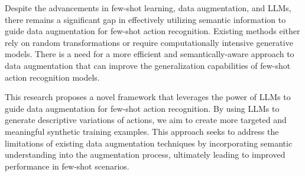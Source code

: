 Despite the advancements in few-shot learning, data augmentation, and LLMs, there remains a significant gap in effectively utilizing semantic information to guide data augmentation for few-shot action recognition. Existing methods either rely on random transformations or require computationally intensive generative models. There is a need for a more efficient and semantically-aware approach to data augmentation that can improve the generalization capabilities of few-shot action recognition models.\newline

This research proposes a novel framework that leverages the power of LLMs to guide data augmentation for few-shot action recognition. By using LLMs to generate descriptive variations of actions, we aim to create more targeted and meaningful synthetic training examples. This approach seeks to address the limitations of existing data augmentation techniques by incorporating semantic understanding into the augmentation process, ultimately leading to improved performance in few-shot scenarios.